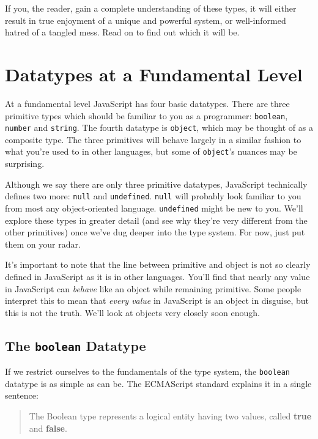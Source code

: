 \documentclass[11pt,letter]{book}
\begin{document}
    If you, the reader, gain a complete understanding of these types, it will either result 
    in true enjoyment of a unique and powerful system, or well-informed hatred of a tangled 
    mess. Read on to find out which it will be.
    
    \section{Datatypes at a Fundamental Level}
    At a fundamental level JavaScript has four basic datatypes. There are three primitive 
    types which should be familiar to you as a programmer: \texttt{boolean}, \texttt{number} 
    and \texttt{string}. The fourth datatype is \texttt{object}, which may be thought of as a 
    composite type. The three primitives will behave largely in a similar fashion to what you're 
    used to in other languages, but some of \texttt{object}'s nuances may be surprising.
    
    Although we say there are only three primitive datatypes, JavaScript technically defines two 
    more: \texttt{null} and \texttt{undefined}. \texttt{null} will probably look familiar to you 
    from most any object-oriented language. \texttt{undefined} might be new to you. We'll explore 
    these types in greater detail (and see why they're very different from the other primitives) 
    once we've dug deeper into the type system. For now, just put them on your radar.
    
    It's important to note that the line between primitive and object is not so clearly defined
    in JavaScript as it is in other languages. You'll find that nearly any value in JavaScript can
    \emph{behave} like an object while remaining primitive. Some people interpret this to mean that
    \emph{every value} in JavaScript is an object in disguise, but this is not the truth. We'll look 
    at objects very closely soon enough.
    
    \subsection{The \texttt{boolean} Datatype}
    If we restrict ourselves to the fundamentals of the type system, the \texttt{boolean} 
    datatype is as simple as can be. The ECMAScript standard explains it in a single sentence:
    
    \begin{quote}
        The Boolean type represents a logical entity having two values, called \textbf{true}
        and \textbf{false}.
    \end{quote}
    
\end{document}
